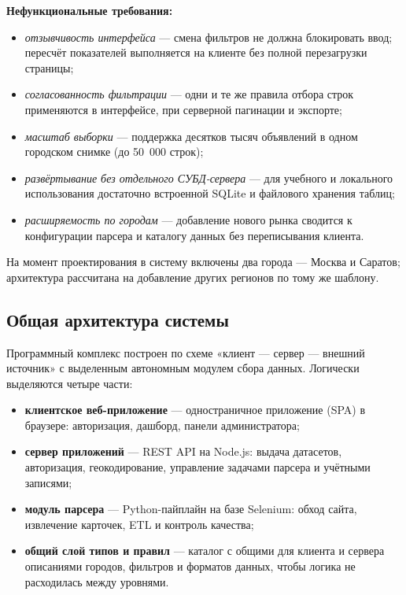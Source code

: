 \textbf{Нефункциональные требования:}
\begin{itemize}
    \item \emph{отзывчивость интерфейса} --- смена фильтров не должна блокировать ввод; пересчёт показателей выполняется на клиенте без полной перезагрузки страницы;
    \item \emph{согласованность фильтрации} --- одни и те же правила отбора строк применяются в интерфейсе, при серверной пагинации и экспорте;
    \item \emph{масштаб выборки} --- поддержка десятков тысяч объявлений в одном городском снимке (до 50~000 строк);
    \item \emph{развёртывание без отдельного СУБД-сервера} --- для учебного и локального использования достаточно встроенной SQLite и файлового хранения таблиц;
    \item \emph{расширяемость по городам} --- добавление нового рынка сводится к конфигурации парсера и каталогу данных без переписывания клиента.
\end{itemize}

На момент проектирования в систему включены два города --- Москва и Саратов; архитектура рассчитана на добавление других регионов по тому же шаблону.

\subsection{Общая архитектура системы}

Программный комплекс построен по схеме «клиент --- сервер --- внешний источник» с выделенным автономным модулем сбора данных. Логически выделяются четыре части:
\begin{itemize}
    \item \textbf{клиентское веб-приложение} --- одностраничное приложение (SPA) в браузере: авторизация, дашборд, панели администратора;
    \item \textbf{сервер приложений} --- REST API на Node.js: выдача датасетов, авторизация, геокодирование, управление задачами парсера и учётными записями;
    \item \textbf{модуль парсера} --- Python-пайплайн на базе Selenium: обход сайта, извлечение карточек, ETL и контроль качества;
    \item \textbf{общий слой типов и правил} --- каталог с общими для клиента и сервера описаниями городов, фильтров и форматов данных, чтобы логика не расходилась между уровнями.
\end{itemize}

